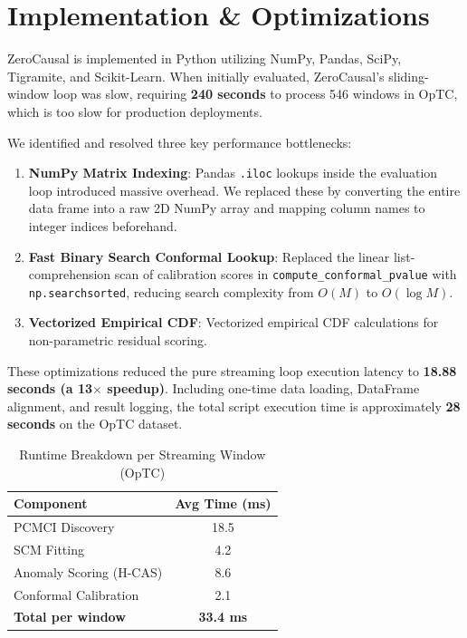 \section{Implementation \& Optimizations}

ZeroCausal is implemented in Python utilizing NumPy, Pandas, SciPy, Tigramite, and Scikit-Learn. When initially evaluated, ZeroCausal's sliding-window loop was slow, requiring \textbf{240 seconds} to process 546 windows in OpTC, which is too slow for production deployments.

We identified and resolved three key performance bottlenecks:
\begin{enumerate}
\item \textbf{NumPy Matrix Indexing}: Pandas \texttt{.iloc} lookups inside the evaluation loop introduced massive overhead. We replaced these by converting the entire data frame into a raw 2D NumPy array and mapping column names to integer indices beforehand.
\item \textbf{Fast Binary Search Conformal Lookup}: Replaced the linear list-comprehension scan of calibration scores in \texttt{compute\_conformal\_pvalue} with \texttt{np.searchsorted}, reducing search complexity from $O(M)$ to $O(\log M)$.
\item \textbf{Vectorized Empirical CDF}: Vectorized empirical CDF calculations for non-parametric residual scoring.
\end{enumerate}

These optimizations reduced the pure streaming loop execution latency to \textbf{18.88 seconds (a 13$\times$ speedup)}. Including one-time data loading, DataFrame alignment, and result logging, the total script execution time is approximately \textbf{28 seconds} on the OpTC dataset.

\begin{table}[htbp]
\caption{Runtime Breakdown per Streaming Window (OpTC)}
\begin{center}
\begin{tabular}{|l|c|}
\hline
\textbf{Component} & \textbf{Avg Time (ms)} \\
\hline
PCMCI Discovery & 18.5 \\
SCM Fitting & 4.2 \\
Anomaly Scoring (H-CAS) & 8.6 \\
Conformal Calibration & 2.1 \\
\hline
\textbf{Total per window} & \textbf{33.4 ms} \\
\hline
\end{tabular}
\label{tab:runtime}
\end{center}
\end{table}

